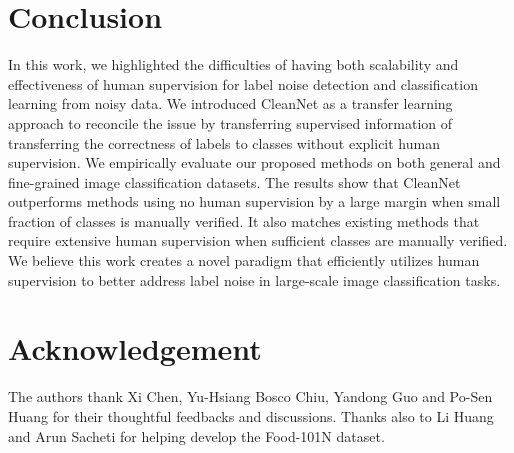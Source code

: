 \documentclass[10pt,twocolumn,letterpaper]{article}
\begin{document}


\section{Conclusion}
In this work, we highlighted the difficulties of having both scalability and effectiveness of human supervision for label noise detection and classification learning from noisy data. We introduced CleanNet as a transfer learning approach to reconcile the issue by transferring supervised information of transferring the correctness of labels to classes without explicit human supervision. We empirically evaluate our proposed methods on both general and fine-grained image classification datasets. The results show that CleanNet outperforms methods using no human supervision by a large margin when small fraction of classes is manually verified. It also matches existing methods that require extensive human supervision when sufficient classes are manually verified. We believe this work creates a novel paradigm that efficiently utilizes human supervision to better address label noise in large-scale image classification tasks.

\section*{Acknowledgement} The authors thank Xi Chen, Yu-Hsiang Bosco Chiu, Yandong Guo and Po-Sen Huang for their thoughtful feedbacks and discussions. Thanks also to Li Huang and Arun Sacheti for helping develop the Food-101N dataset. 

{\small


}
\end{document}

